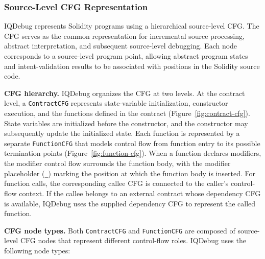 \documentclass[11pt,oneside]{report}
\theoremstyle{plain}
\theoremstyle{definition}
\theoremstyle{remark}
\begin{document}
\subsubsection{Source-Level CFG Representation}
\label{subsubsec:design:representation:cfg}
IQDebug represents Solidity programs using a hierarchical source-level CFG.
The CFG serves as the common representation for incremental source processing, abstract interpretation, and subsequent source-level debugging.
Each node corresponds to a source-level program point, allowing abstract program states and intent-validation results to be associated with positions in the Solidity source code.

\noindent\textbf{CFG hierarchy.}
IQDebug organizes the CFG at two levels.
At the contract level, a \texttt{ContractCFG} represents state-variable initialization, constructor execution, and the functions defined in the contract (Figure~\ref{fig:contract-cfg}).
State variables are initialized before the constructor, and the constructor may subsequently update the initialized state.
Each function is represented by a separate \texttt{FunctionCFG} that models control flow from function entry to its possible termination points (Figure~\ref{fig:function-cfg}).
When a function declares modifiers, the modifier control flow surrounds the function body, with the modifier placeholder (\texttt{\_}) marking the position at which the function body is inserted.
For function calls, the corresponding callee CFG is connected to the caller's control-flow context.
If the callee belongs to an external contract whose dependency CFG is available, IQDebug uses the supplied dependency CFG to represent the called function.

\smallskip
\noindent\textbf{CFG node types.}
Both \texttt{ContractCFG} and \texttt{FunctionCFG} are composed of source-level CFG nodes that represent different control-flow roles.
IQDebug uses the following node types:
\end{document}
